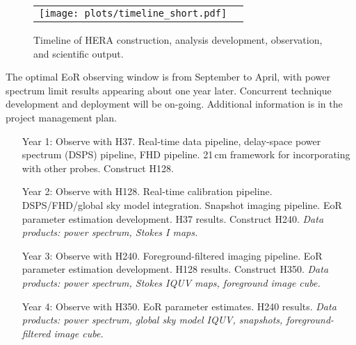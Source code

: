 \documentclass[preprint,11pt]{aastex}
\begin{document}
\begin{figure}[th]
	\vspace{-7pt}
	\begin{tabular}{ll}
	\begin{minipage}{5in}
		\texttt{[image: plots/timeline\_short.pdf]}
		\end{minipage} & \hspace{-.15in}
	\begin{minipage}{1.35in}
\captionsetup{justification=raggedright,
singlelinecheck=false
}
	\caption{Timeline of HERA construction, analysis development, observation, and scientific output.}
	\label{fig:timeline}
	\end{minipage}
	\end{tabular}
	\vspace{-8pt}
\end{figure}



The optimal EoR observing window is from September to April, with power spectrum limit results appearing about one year later.  Concurrent technique development and deployment will be on-going. Additional information is in the project management plan.
\begin{itemize}[leftmargin=0.7in]
\item[Year 1:] Observe with H37.  Real-time data pipeline, delay-space power spectrum (DSPS) pipeline, FHD pipeline.  21\,cm framework for incorporating with other probes. Construct H128.
\item[Year 2:] Observe with H128.  Real-time calibration pipeline.  DSPS/FHD/global sky model integration. Snapshot imaging pipeline.  EoR parameter estimation development.  H37 results.  Construct H240.  {\em Data products:  power spectrum, Stokes I maps.}
\item[Year 3:] Observe with H240.  Foreground-filtered imaging pipeline.  EoR parameter estimation development.   H128 results. Construct H350.  {\em Data products:  power spectrum, Stokes IQUV maps, foreground image cube.}
\item[Year 4:] Observe with H350.  EoR parameter estimates.  H240 results.  {\em Data products:  power spectrum, global sky model IQUV, snapshots, foreground-filtered image cube.}
\end{itemize}

\vspace{-18pt}
\end{document}
